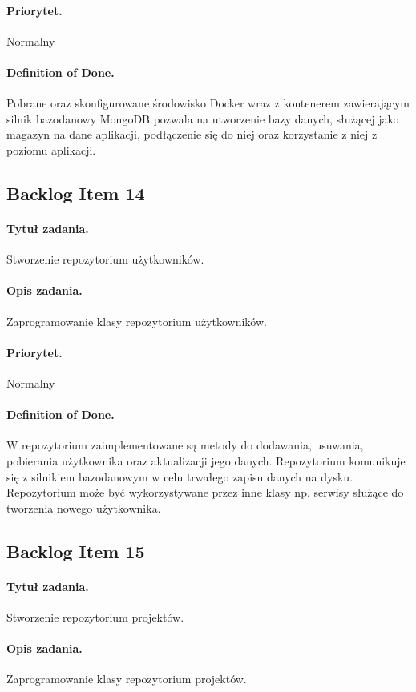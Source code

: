 ﻿\documentclass[a4paper]{article}
\begin{document}
\paragraph{Priorytet.} Normalny
\paragraph{Definition of Done.} Pobrane oraz skonfigurowane środowisko Docker wraz z kontenerem zawierającym silnik bazodanowy MongoDB pozwala na utworzenie bazy danych, służącej jako magazyn na dane aplikacji, podłączenie się do niej oraz korzystanie z niej z poziomu aplikacji.

\subsection{Backlog Item 14} 
\paragraph{Tytuł zadania.} Stworzenie repozytorium użytkowników.
\paragraph{Opis zadania.} Zaprogramowanie klasy repozytorium użytkowników.
\paragraph{Priorytet.} Normalny
\paragraph{Definition of Done.} W repozytorium zaimplementowane są metody do dodawania, usuwania, pobierania użytkownika oraz aktualizacji jego danych. Repozytorium komunikuje się z silnikiem bazodanowym w celu trwałego zapisu danych na dysku. Repozytorium może być wykorzystywane przez inne klasy np. serwisy służące do tworzenia nowego użytkownika.

\subsection{Backlog Item 15} 
\paragraph{Tytuł zadania.} Stworzenie repozytorium projektów.
\paragraph{Opis zadania.} Zaprogramowanie klasy repozytorium projektów.
\end{document}
